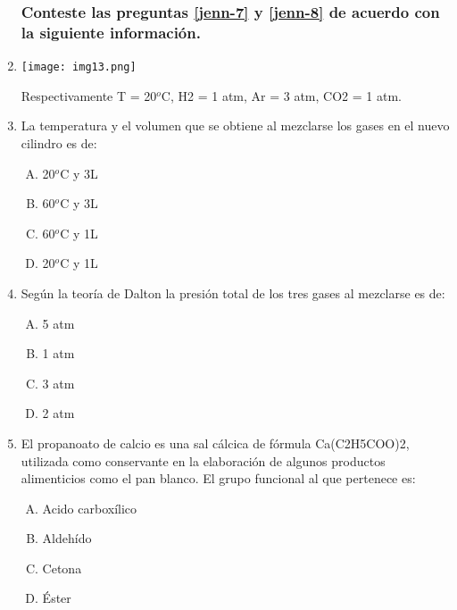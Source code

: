 \begin{enumerate}

\subsubsection*{Conteste las preguntas \ref{jenn-7} y \ref{jenn-8} de acuerdo con la siguiente información.}

\item \texttt{[image: img13.png]}

Respectivamente T = 20$^o$C, H2 = 1 atm, Ar = 3 atm, CO2 = 1 atm.



\item  La temperatura y el volumen que se obtiene al mezclarse los gases en el nuevo cilindro es de:\label{jenn-7}


\begin{enumerate}[(A)]
\item 20$^o$C y 3L
\item  60$^o$C y 3L
\item  60$^o$C y 1L
\item  20$^o$C y 1L
\end{enumerate}




\item Según la teoría de Dalton la presión total de los tres gases al mezclarse es de: \label{jenn-8}


\begin{enumerate}[(A)]
\item    5 atm
\item  1 atm
\item  3 atm
\item  2 atm
\end{enumerate}




\item  El propanoato de calcio es una sal cálcica de fórmula Ca(C2H5COO)2, utilizada como conservante en la elaboración de algunos productos alimenticios como el pan blanco. El grupo funcional al que pertenece es:\label{jenn-9}


\begin{enumerate}[(A)]
\item Acido carboxílico
\item Aldehído
\item Cetona
\item Éster 
\end{enumerate}



\end{enumerate}
